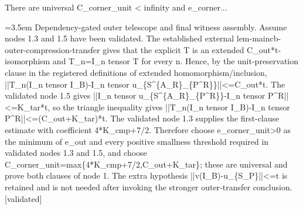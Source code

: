 \documentclass{article}
\newcommand{\step}[1]{\par\noindent\hangindent=3.5em\hangafter=1%
  \makebox[3.5em][l]{\textbf{#1.}}}
\newcommand{\steptag}[1]{\hfill{\small\textsf{[#1]}}}
\begin{document}
\begin{proofbox}{There are universal C\_corner\_unit < infinity and e\_corner...}
\step{1.6.1} Dependency-gated outer telescope and final witness assembly. Assume nodes 1.3 and 1.5 have been validated. The established external lem-maincb-outer-compression-transfer gives that the explicit T is an extended C\_out*t-isomorphism and T\_n=I\_n tensor T for every n. Hence, by the unit-preservation clause in the registered definitions of extended homomorphism/inclusion, ||T\_n(I\_n tensor I\_B)-I\_n tensor u\_\{S\textasciicircum{}\{A\_R\}\_\{P\textasciicircum{}R\}\}||<=C\_out*t. The validated node 1.5 gives ||I\_n tensor u\_\{S\textasciicircum{}\{A\_R\}\_\{P\textasciicircum{}R\}\}-I\_n tensor P\textasciicircum{}R||<=K\_tar*t, so the triangle inequality gives ||T\_n(I\_n tensor I\_B)-I\_n tensor P\textasciicircum{}R||<=(C\_out+K\_tar)*t. The validated node 1.3 supplies the first-clause estimate with coefficient 4*K\_cmp+7/2. Therefore choose e\_corner\_unit>0 as the minimum of e\_out and every positive smallness threshold required in validated nodes 1.3 and 1.5, and choose C\_corner\_unit=max\{4*K\_cmp+7/2,C\_out+K\_tar\}; these are universal and prove both clauses of node 1. The extra hypothesis ||v(I\_B)-u\_\{S\_P\}||<=t is retained and is not needed after invoking the stronger outer-transfer conclusion. \steptag{validated} \\[4pt]

\end{proofbox}
\end{document}
